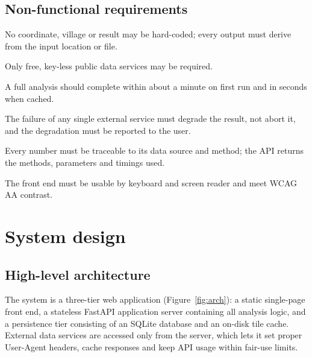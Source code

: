 \documentclass[11pt,a4paper]{article}
\begin{document}
\subsection{Non-functional requirements}
\begin{description}[style=nextline,leftmargin=1.2em]
  \item[Generality] No coordinate, village or result may be hard-coded; every output must derive
        from the input location or file.
  \item[Cost] Only free, key-less public data services may be required.
  \item[Performance] A full analysis should complete within about a minute on first run and in
        seconds when cached.
  \item[Robustness] The failure of any single external service must degrade the result, not
        abort it, and the degradation must be reported to the user.
  \item[Transparency] Every number must be traceable to its data source and method; the API
        returns the methods, parameters and timings used.
  \item[Accessibility] The front end must be usable by keyboard and screen reader and meet WCAG
        AA contrast.
\end{description}

\section{System design}\label{sec:design}
\subsection{High-level architecture}
The system is a three-tier web application (Figure~\ref{fig:arch}): a static single-page
front end, a stateless FastAPI application server containing all analysis logic, and a
persistence tier consisting of an SQLite database and an on-disk tile cache. External data
services are accessed only from the server, which lets it set proper User-Agent headers, cache
responses and keep API usage within fair-use limits.
\end{document}
